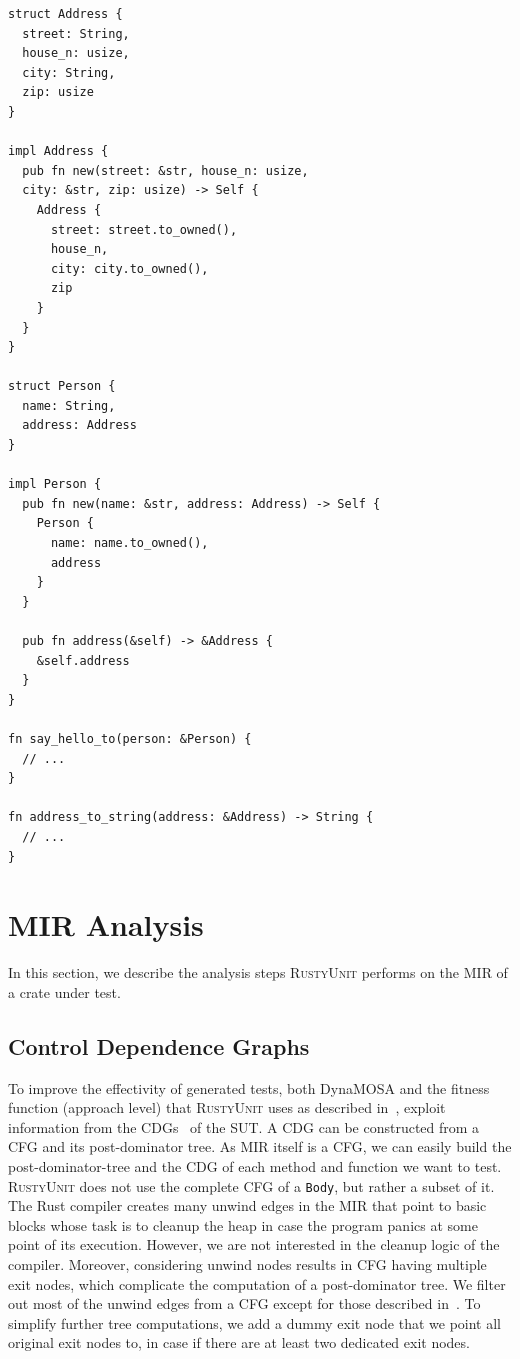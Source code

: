 \documentclass[paper=a4,%
  twoside,%
  BCOR4mm,%
  abstract=true,%
  toc=bibliography,%
  chapterprefix=true,%
  toc=bibliographynumbered,%
  open=right,%
  english,%
  pagesize=pdftex]{scrreprt}
\newcommand{\tech}{\textsc{RustyUnit}\xspace}
\newcommand{\hir}{\ac{HIR}\xspace}
\newcommand{\mir}{\ac{MIR}\xspace}
\newcommand{\cfg}{\ac{CFG}\xspace}
\newcommand{\cdgs}{\acp{CDG}\xspace}
\newcommand{\sut}{\ac{SUT}\xspace}
\begin{document}
\begin{lstlisting}[style=boxed, caption={After \hir analysis, we know how a \texttt{Person} object can be generated to be used in \texttt{say\string_hello\string_to}.}, label=lst:hir-analysis-example]
struct Address {
  street: String,
  house_n: usize,
  city: String,
  zip: usize
}

impl Address {
  pub fn new(street: &str, house_n: usize,
  city: &str, zip: usize) -> Self {
    Address {
      street: street.to_owned(),
      house_n,
      city: city.to_owned(),
      zip
    }
  }
}

struct Person {
  name: String,
  address: Address
}

impl Person {
  pub fn new(name: &str, address: Address) -> Self {
    Person {
      name: name.to_owned(),
      address
    }
  }

  pub fn address(&self) -> &Address {
    &self.address
  }
}

fn say_hello_to(person: &Person) {
  // ...
}

fn address_to_string(address: &Address) -> String {
  // ...
}
\end{lstlisting}

\section{MIR Analysis}
In this section, we describe the analysis steps \tech performs on the \mir of a crate under test.

\subsection{Control Dependence Graphs}
To improve the effectivity of generated tests, both \ac{DynaMOSA} and the fitness function (approach level) that \tech uses as described in~, exploit information from the \cdgs~\cite{Ferrante1987} of the \sut. A \ac{CDG} can be constructed from a \cfg and its post-dominator tree. As \mir itself is a \cfg, we can easily build the post-dominator-tree and the \ac{CDG} of each method and function we want to test. \tech does not use the complete \cfg of a \texttt{Body}, but rather a subset of it. The Rust compiler creates many unwind edges in the \mir that point to basic blocks whose task is to cleanup the heap in case the program panics at some point of its execution. However, we are not interested in the cleanup logic of the compiler. Moreover, considering unwind nodes results in \cfg having multiple exit nodes, which complicate the computation of a post-dominator tree. We filter out most of the unwind edges from a \cfg except for those described in~. To simplify further tree computations, we add a dummy exit node that we point all original exit nodes to, in case if there are at least two dedicated exit nodes.
\end{document}

